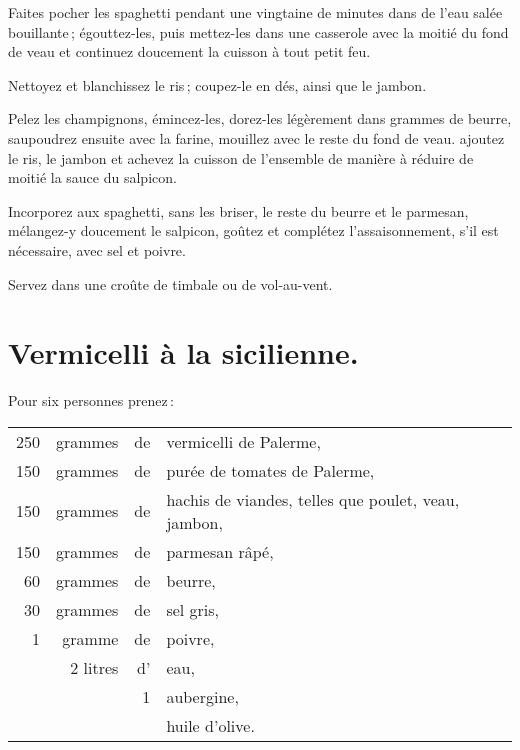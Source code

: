 Faites pocher les spaghetti pendant une vingtaine de minutes dans de l'eau
salée bouillante ; égouttez-les, puis mettez-les dans une casserole avec la
moitié du fond de veau et continuez doucement la cuisson à tout petit feu.

Nettoyez et blanchissez le ris ; coupez-le en dés, ainsi que le jambon.

Pelez les champignons, émincez-les, dorez-les légèrement dans {\mmm}
grammes de beurre, saupoudrez ensuite avec la farine, mouillez avec le reste du
fond de veau. ajoutez le ris, le jambon et achevez la cuisson de l'ensemble de
manière à réduire de moitié la sauce du salpicon.

Incorporez aux spaghetti, sans les briser, le reste du beurre et le parmesan,
mélangez-y doucement le salpicon, goûtez et complétez l'assaisonnement, s'il
est nécessaire, avec sel et poivre.

Servez dans une croûte de timbale ou de vol-au-vent.

\section*{\centering Vermicelli à la sicilienne.}
{}

Pour six personnes prenez :

\footnotesize
\begin{longtable}{rrrp{16em}}
    250 & grammes  & de & vermicelli de Palerme,                                                          \\
    150 & grammes  & de & purée de tomates de Palerme,                                                    \\
    150 & grammes  & de & hachis de viandes, telles que poulet, veau, jambon,                             \\
    150 & grammes  & de & parmesan râpé,                                                                  \\
     60 & grammes  & de & beurre,                                                                         \\
     30 & grammes  & de & sel gris,                                                                       \\
      1 & gramme   & de & poivre,                                                                         \\
        & 2 litres & d' & eau,                                                                            \\
        &          &  1 & aubergine,                                                                      \\
        &          &    & huile d'olive.                                                                  \\
\end{longtable}
\normalsize

